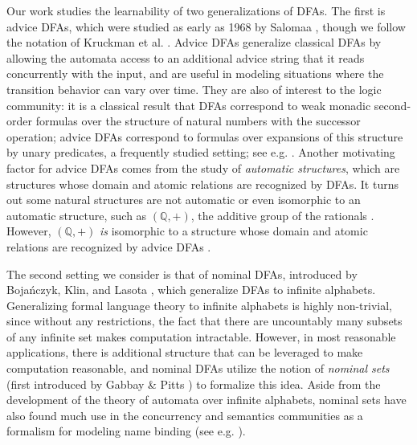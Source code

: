 \documentclass[runningheads]{llncs}
\newcommand{\bb}{\mathbb}
\begin{document}
Our work studies the learnability of two generalizations of DFAs. 
The first is advice DFAs, which were studied as early as 1968 by Salomaa \cite{salomaa:finite-automata-time-variant-structure}, though we follow the notation of Kruckman et al. \cite{kruckman-etal:myhill-nerode-automata-advice}.
Advice DFAs generalize classical DFAs by allowing the automata access to an additional advice string that it reads concurrently with the input, and are useful in modeling situations where the transition behavior can vary over time. 
They are also of interest to the logic community: it is a classical result that DFAs correspond to weak monadic second-order formulas over the structure of natural numbers with the successor operation; advice DFAs correspond to formulas over expansions of this structure by unary predicates, a frequently studied setting; see e.g. \cite{elgot-rabin:decidability-undecidability-extensions-of-successor,carton-thomas:monadic-theory-morphic-infinite-words,rabinovich-thomas:decidable-theories-of-natural-numbers-unary-predicates,barany:automatic-omega-words-decidable-MSO-theory}.
Another motivating factor for advice DFAs comes from the study of \emph{automatic structures}, which are structures whose domain and atomic relations are recognized by DFAs. 
It turns out some natural structures are not automatic or even isomorphic to an automatic structure, such as $(\bb Q, +)$, the additive group of the rationals \cite{tsankov:additive-group-of-rationals-not-automatic}.
However, $(\bb Q, +)$ \textit{is} isomorphic to a structure whose domain and atomic relations are recognized by advice DFAs \cite{nies:describing-groups,kruckman-etal:myhill-nerode-automata-advice}.

The second setting we consider is that of nominal DFAs, introduced by Boja\'nczyk, Klin, and Lasota \cite{bojanczyk-klin-lasota:automata-theory-in-nominal-sets}, which generalize DFAs to infinite alphabets. 
Generalizing formal language theory to infinite alphabets is highly non-trivial, since without any restrictions, the fact that there are uncountably many subsets of any infinite set makes computation intractable.
However, in most reasonable applications, there is additional structure that can be leveraged to make computation reasonable, and nominal DFAs utilize the notion of \textit{nominal sets} (first introduced by Gabbay \& Pitts \cite{gabbay-pitts:new-approach-to-abstract-syntax}) to formalize this idea. 
Aside from the development of the theory of automata over infinite alphabets, nominal sets have also found much use in the concurrency and semantics communities as a formalism for modeling name binding (see e.g. \cite{montanari-pistore:history-dependent-automata-an-introduction,pitts:nominal-sets-names-and-symmetry-in-computer-science}).
\end{document}
